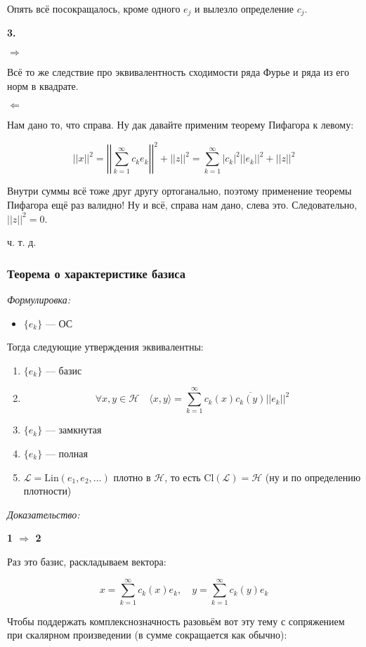 \documentclass{article}
\def\sk#1#2{\langle #1, #2 \rangle}
\begin{document}
Опять всё посокращалось, кроме одного $e_j$ и вылезло определение $c_j$.

\textbf{3. }

$\Rightarrow$

Всё то же следствие про эквивалентность сходимости ряда Фурье и ряда из его норм в квадрате.

$\Leftarrow$

Нам дано то, что справа. Ну дак давайте применим теорему Пифагора к левому:

\[||x||^2 = \left|\left| \sum_{k = 1}^{\infty} c_k e_k\right|\right|^2 + ||z||^2 = \sum_{k = 1}^{\infty} |c_k|^2||e_k||^2 + ||z||^2\]

Внутри суммы всё тоже друг другу ортоганально, поэтому применение теоремы Пифагора ещё раз валидно! Ну и всё, справа нам дано, слева это. Следовательно, $||z||^2 = 0$.

ч. т. д. 

\subsubsection{Теорема о характеристике базиса}
\textit{Формулировка:}

\begin{itemize}
    \item $\{e_k\}$ --- ОС
\end{itemize}

Тогда следующие утверждения эквивалентны:

\begin{enumerate}
    \item $\{e_k\}$ --- базис
    \item \[\forall x, y \in \mathcal{H} \quad \sk{x}{y} = \sum_{k = 1}^{\infty} c_k(x) \overline{c_k(y)} ||e_k||^2\]
    \item $\{e_k\}$ --- замкнутая
    \item $\{e_k\}$ --- полная
    \item $\mathcal{L} = \text{Lin}(e_1, e_2, \ldots)$ плотно в $\mathcal{H}$, то есть Cl$(\mathcal{L}) = \mathcal{H}$ (ну и по определению плотности)
\end{enumerate}

\textit{Доказательство:}

\textbf{1 $\Rightarrow$ 2}

Раз это базис, раскладываем вектора:

\[x = \sum_{k = 1}^{\infty} c_k(x)e_k, \quad y = \sum_{k = 1}^{\infty} c_k(y)e_k\]

Чтобы поддержать комплекснозначность разовьём вот эту тему с сопряжением при скалярном произведении (в сумме сокращается как обычно):
\end{document}
